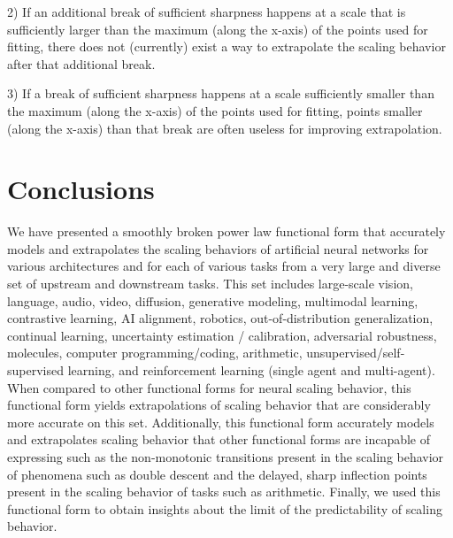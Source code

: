 \documentclass{article} %
\begin{document}
2) If an additional break of sufficient sharpness happens at a scale that is sufficiently larger than the maximum (along the x-axis) of the points used for fitting, there does not (currently) exist a way to extrapolate the scaling behavior after that additional break.

3) If a break of sufficient sharpness happens at a scale sufficiently smaller than the maximum (along the x-axis) of the points used for fitting, points smaller (along the x-axis) than that break are often useless for improving extrapolation.




%
\section{Conclusions}
We have presented a smoothly broken power law functional form that accurately models and extrapolates the scaling behaviors of artificial neural networks for various architectures and for each of various tasks from a very large and diverse set of upstream and downstream tasks. This set includes large-scale vision, language, audio, video, diffusion, generative modeling, multimodal learning, contrastive learning, AI alignment, robotics, out-of-distribution generalization, continual learning, uncertainty estimation / calibration, adversarial robustness, molecules, computer programming/coding, arithmetic, unsupervised/self-supervised learning, and reinforcement learning (single agent and multi-agent). When compared to other functional forms for neural scaling behavior, this functional form yields extrapolations of scaling behavior that are considerably more accurate on this set. Additionally, this functional form accurately models and extrapolates scaling behavior that other functional forms are incapable of expressing such as the non-monotonic transitions present in the scaling behavior of phenomena such as double descent and the delayed, sharp inflection points present in the scaling behavior of tasks such as arithmetic. Finally, we used this functional form to obtain insights about the limit of the predictability of scaling behavior.
\end{document}
